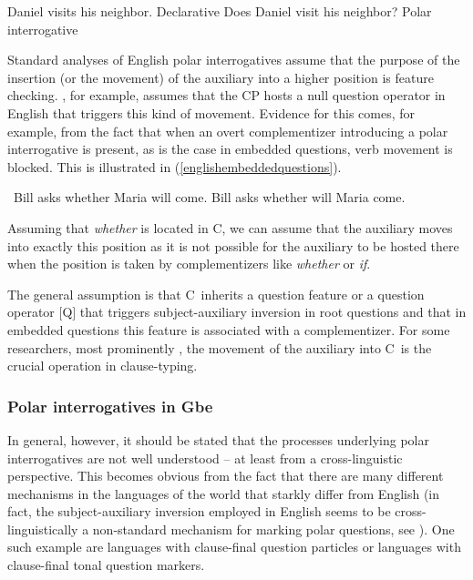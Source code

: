 \begin{exe}
\ex\label{simpleenglishpolarinterrtwo}\begin{xlist}
\ex Daniel visits his neighbor. \hfill Declarative\label{simpleenglishpolarinterra}
\ex Does Daniel visit his neighbor? \hfill Polar interrogative\label{simpleenglishpolarinterrb}
\end{xlist}
\end{exe} 

\noindent Standard analyses of English polar interrogatives assume that the purpose of the insertion (or the movement) of the auxiliary into a higher position is feature checking. \citet{roberts1993}, for example, assumes that the CP hosts a null question operator in English that triggers this kind of movement. Evidence for this comes, for example, from the fact that when an overt complementizer introducing a polar interrogative is present, as is the case in embedded questions, verb movement is blocked. This is illustrated in (\ref{englishembeddedquestions}).%

\begin{exe}
\ex\label{englishembeddedquestions}\begin{xlist}
\ex \textcolor{white}{*}Bill asks whether Maria will come. \label{englishembeddedquestionsa}
\ex *Bill asks whether will Maria come.  \label{englishembeddedquestionsb}
\end{xlist}
\end{exe} 

\noindent Assuming that \textit{whether} is located in C\textdegree , we can assume that the auxiliary moves into exactly this position as it is not possible for the auxiliary to be hosted there when the position is taken by complementizers like \textit{whether} or \textit{if}.

The general assumption is that C\textdegree\ inherits a question feature or a question operator $[$Q$]$ that triggers subject-auxiliary inversion in root questions and that in embedded questions this feature is associated with a complementizer. For some researchers, most prominently \citet{cheng1997typology}, the movement of the auxiliary into C\textdegree\ is the crucial operation in clause-typing. 

\subsubsection{Polar interrogatives in Gbe}
In general, however, it should be stated that the processes underlying polar interrogatives are not well understood -- at least from a cross-linguistic perspective. This becomes obvious from the fact that there are many different mechanisms in the languages of the world that starkly differ from English (in fact, the subject-auxiliary inversion employed in English seems to be cross-linguistically a non-standard mechanism for marking polar questions, see \citealt{ultan1978some}). One such example are languages with clause-final question particles or languages with clause-final tonal question markers.

